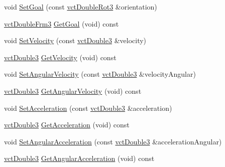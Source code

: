 \begin{DoxyCompactItemize}
\item 
void \hyperlink{classprm_position_cartesian_set_a1eacb92ecdabd989409a8bcc6722bae6}{Set\-Goal} (const \hyperlink{vct_transformation_types_8h_ade4308c597095f786fada3decdcbd7c3}{vct\-Double\-Rot3} \&orientation)
\item 
\hyperlink{vct_transformation_types_8h_acc33ebdc1b58783aa59508c7b5200b56}{vct\-Double\-Frm3} \hyperlink{classprm_position_cartesian_set_ae3aaa8e5c1cf147994ce754fe4b50926}{Get\-Goal} (void) const 
\item 
void \hyperlink{classprm_position_cartesian_set_afab9eb04396864bbcbc3f71c681cf4d0}{Set\-Velocity} (const \hyperlink{vct_fixed_size_vector_types_8h_a4a89122c9d7f72c3f31fe8126e17c3af}{vct\-Double3} \&velocity)
\item 
\hyperlink{vct_fixed_size_vector_types_8h_a4a89122c9d7f72c3f31fe8126e17c3af}{vct\-Double3} \hyperlink{classprm_position_cartesian_set_ab65fa0a5570e107274b8a5f20edf27f0}{Get\-Velocity} (void) const 
\item 
void \hyperlink{classprm_position_cartesian_set_a3af1e877b5ecaa21d516d844715b97c3}{Set\-Angular\-Velocity} (const \hyperlink{vct_fixed_size_vector_types_8h_a4a89122c9d7f72c3f31fe8126e17c3af}{vct\-Double3} \&velocity\-Angular)
\item 
\hyperlink{vct_fixed_size_vector_types_8h_a4a89122c9d7f72c3f31fe8126e17c3af}{vct\-Double3} \hyperlink{classprm_position_cartesian_set_a2b773b4789abbccd39541883f23d7f1e}{Get\-Angular\-Velocity} (void) const 
\item 
void \hyperlink{classprm_position_cartesian_set_aa4d1e6e0e540d66b99f4a363f56ee8e1}{Set\-Acceleration} (const \hyperlink{vct_fixed_size_vector_types_8h_a4a89122c9d7f72c3f31fe8126e17c3af}{vct\-Double3} \&acceleration)
\item 
\hyperlink{vct_fixed_size_vector_types_8h_a4a89122c9d7f72c3f31fe8126e17c3af}{vct\-Double3} \hyperlink{classprm_position_cartesian_set_ada89cbe0f54d97981def5d3e1e11844f}{Get\-Acceleration} (void) const 
\item 
void \hyperlink{classprm_position_cartesian_set_a376823514584dae81ad1beda00739b02}{Set\-Angular\-Acceleration} (const \hyperlink{vct_fixed_size_vector_types_8h_a4a89122c9d7f72c3f31fe8126e17c3af}{vct\-Double3} \&acceleration\-Angular)
\item 
\hyperlink{vct_fixed_size_vector_types_8h_a4a89122c9d7f72c3f31fe8126e17c3af}{vct\-Double3} \hyperlink{classprm_position_cartesian_set_a907a637dc92362275905111e36220595}{Get\-Angular\-Acceleration} (void) const 
\item 

\end{DoxyCompactItemize}
